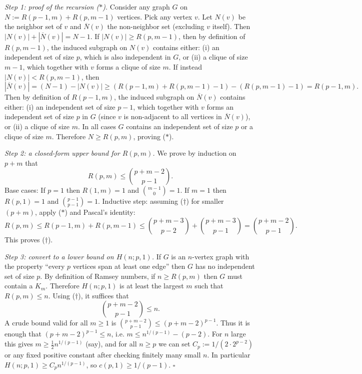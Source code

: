 \emph{Step 1: proof of the recursion ($\ast$).}
Consider any graph $G$ on $N:=R(p-1,m)+R(p,m-1)$ vertices.
Pick any vertex $v$.
Let $N(v)$ be the neighbor set of $v$ and $\overline{N}(v)$ the non-neighbor set (excluding $v$ itself).
Then $|N(v)|+|\overline{N}(v)|=N-1$.
If $|N(v)|\ge R(p,m-1)$, then by definition of $R(p,m-1)$, the induced subgraph on $N(v)$ contains either:
(i) an independent set of size $p$, which is also independent in $G$, or
(ii) a clique of size $m-1$, which together with $v$ forms a clique of size $m$.
If instead $|N(v)|<R(p,m-1)$, then
\[
|\overline{N}(v)| = (N-1)-|N(v)| \ge (R(p-1,m)+R(p,m-1)-1) - (R(p,m-1)-1)=R(p-1,m).
\]
Then by definition of $R(p-1,m)$, the induced subgraph on $\overline{N}(v)$ contains either:
(i) an independent set of size $p-1$, which together with $v$ forms an independent set of size $p$ in $G$ (since $v$ is non-adjacent to all vertices in $\overline{N}(v)$), or
(ii) a clique of size $m$.
In all cases $G$ contains an independent set of size $p$ or a clique of size $m$.
Therefore $N\ge R(p,m)$, proving ($\ast$).

\emph{Step 2: a closed-form upper bound for $R(p,m)$.}
We prove by induction on $p+m$ that
\begin{equation}
R(p,m) \le \binom{p+m-2}{p-1}.
\tag{$\dagger$}
\end{equation}
Base cases: If $p=1$ then $R(1,m)=1$ and $\binom{m-1}{0}=1$.
If $m=1$ then $R(p,1)=1$ and $\binom{p-1}{p-1}=1$.
Inductive step: assuming ($\dagger$) for smaller $(p+m)$, apply ($\ast$) and Pascal's identity:
\[
R(p,m)\le R(p-1,m)+R(p,m-1)
\le \binom{p+m-3}{p-2}+\binom{p+m-3}{p-1}
=\binom{p+m-2}{p-1}.
\]
This proves ($\dagger$).

\emph{Step 3: convert to a lower bound on $H(n;p,1)$.}
If $G$ is an $n$-vertex graph with the property ``every $p$ vertices span at least one edge'' then $G$ has no independent set of size $p$.
By definition of Ramsey numbers, if $n\ge R(p,m)$ then $G$ must contain a $K_m$.
Therefore $H(n;p,1)$ is at least the largest $m$ such that $R(p,m)\le n$.
Using ($\dagger$), it suffices that
\[
\binom{p+m-2}{p-1}\le n.
\]
A crude bound valid for all $m\ge 1$ is
\(
\binom{p+m-2}{p-1} \le (p+m-2)^{p-1}.
\)
Thus it is enough that $(p+m-2)^{p-1}\le n$, i.e. $m\le n^{1/(p-1)}-(p-2)$.
For $n$ large this gives $m\ge \tfrac12 n^{1/(p-1)}$ (say), and for all $n\ge p$ we can set
$C_p := 1/(2\cdot 2^{p-2})$ or any fixed positive constant after checking finitely many small $n$.
In particular $H(n;p,1)\ge C_p n^{1/(p-1)}$, so $c(p,1)\ge 1/(p-1)$.
\hfill$\square$

